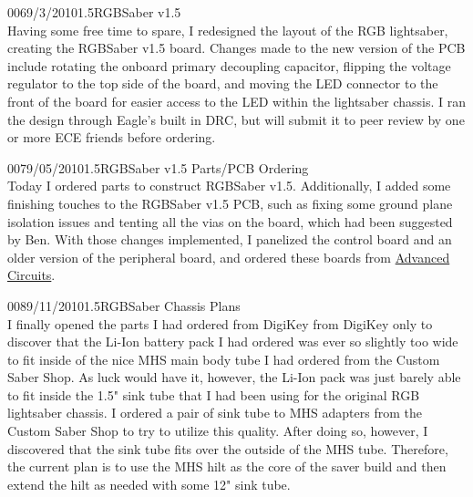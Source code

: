 \documentclass[12pt,letterpaper,onecolumn]{article}
\begin{document}
\begin{nbentry}{006}{9/3/2010}{1.5}{RGBSaber v1.5}
\\
	Having some free time to spare, I redesigned the layout of the RGB lightsaber, creating the RGBSaber v1.5 board. Changes made to the new version of the PCB include rotating the onboard primary decoupling capacitor, flipping the voltage regulator to the top side of the board, and moving the LED connector to the front of the board for easier access to the LED within the lightsaber chassis. I ran the design through Eagle's built in DRC, but will submit it to peer review by one or more ECE friends before ordering.
\end{nbentry}

\begin{nbentry}{007}{9/05/2010}{1.5}{RGBSaber v1.5 Parts/PCB Ordering}
\\
	Today I ordered parts to construct RGBSaber v1.5. Additionally, I added some finishing touches to the RGBSaber v1.5 PCB, such as fixing some ground plane isolation issues and tenting all the vias on the board, which had been suggested by Ben. With those changes implemented, I panelized the control board and an older version of the peripheral board, and ordered these boards from \href{http://www.4pcb.com}{Advanced Circuits}.
\end{nbentry}

\begin{nbentry}{008}{9/11/2010}{1.5}{RGBSaber Chassis Plans}
\\
	I finally opened the parts I had ordered from DigiKey from DigiKey only to discover that the Li-Ion battery pack I had ordered was ever so slightly too wide to fit inside of the nice MHS main body tube I had ordered from the Custom Saber Shop. As luck would have it, however, the Li-Ion pack was just barely able to fit inside the 1.5" sink tube that I had been using for the original RGB lightsaber chassis. I ordered a pair of sink tube to MHS adapters from the Custom Saber Shop to try to utilize this quality. After doing so, however, I discovered that the sink tube fits over the outside of the MHS tube. Therefore, the current plan is to use the MHS hilt as the core of the saver build and then extend the hilt as needed with some 12" sink tube.
\end{nbentry}
\end{document}
